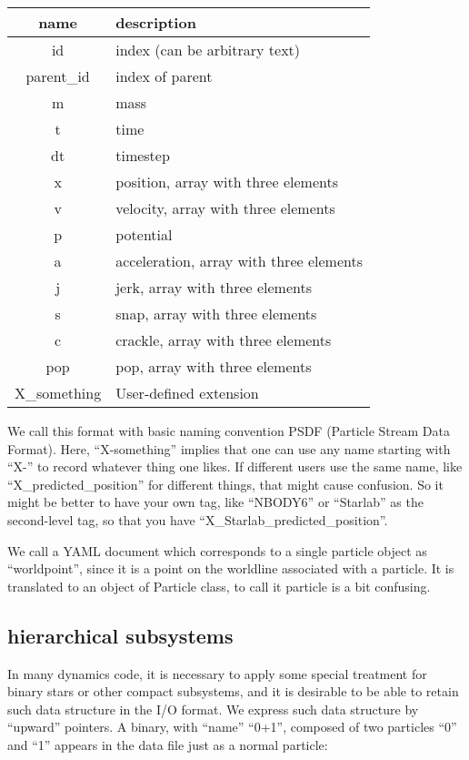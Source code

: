 \documentclass[12pt]{article}
\begin{document}
\begin{center}
\begin{tabular}{|c|l|}
\hline
name & description\\
\hline
id & index (can be arbitrary text)\\
parent\_id & index  of parent\\
m & mass\\
t & time\\
dt & timestep\\
x  & position, array with three elements\\
v  & velocity, array with three elements\\
p  & potential\\
a  & acceleration, array with three elements\\
j  & jerk, array with three elements\\
s  & snap, array with three elements\\
c  & crackle, array with three elements\\
pop  & pop, array with three elements\\
X\_something & User-defined extension\\
\hline
\end{tabular}
\end{center}

We call this format with basic naming convention PSDF (Particle Stream
Data Format). Here, ``X-something'' implies that one can use any name
starting with ``X-'' to record whatever thing one likes. If different
users use the same name, like ``X\_predicted\_position'' for different
things, that might cause confusion. So it might be better to have your
own tag, like ``NBODY6'' or ``Starlab'' as the second-level tag, so
that you have ``X\_Starlab\_predicted\_position''.

We call a YAML document which corresponds to a single particle object
as ``worldpoint'', since it is a point on the worldline associated
with a particle. It is translated to an object of Particle class, to
call it particle is a bit confusing.

\subsection{hierarchical subsystems}

In many dynamics code, it is necessary to apply some special treatment
for binary stars or other compact subsystems, and it is desirable to
be able to  retain such data structure in the I/O format. We express
such data structure by ``upward'' pointers. A binary, with ``name''
``0+1'', composed of two particles ``0'' and ``1'' appears in the data
file just as a normal particle:
\end{document}
